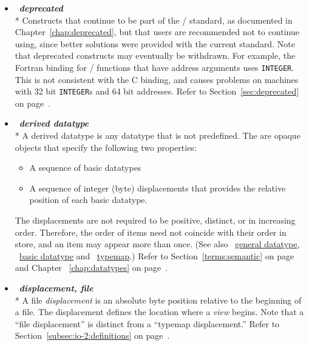 \begin{itemize}
\label{glossary:deprecated}
\item  ~\hypertarget{glossary:deprecated}{\emph{\textbf{deprecated}}} \\*
Constructs that continue to be part of the \MPI/ standard, 
as documented in Chapter~\ref{chap:deprecated}, 
but that users are recommended not to continue using, since 
better solutions were provided with the current standard.
Note that deprecated constructs may eventually be withdrawn.
For example, the Fortran binding 
for \mpii/ functions that have address arguments uses {\tt INTEGER}.
This is not consistent with the C binding, and causes problems on
machines with 32 bit {\tt INTEGER}s and 64 bit addresses.
Refer to Section~\ref{sec:deprecated} on page~\pageref{sec:deprecated}.

\label{glossary:derived_datatype}
\item  ~\hypertarget{glossary:derived_datatype}{\emph{\textbf{derived datatype}}} \\*
A derived datatype is any datatype that is not predefined.
The are opaque objects that specify the following two
properties:
\begin{itemize}
\item
A sequence of basic datatypes
\item
A sequence of integer (byte) displacements that provides the relative
position of each basic datatype.
\end{itemize}
The displacements are not required to be positive, distinct, or
in increasing order. Therefore, the order of items need not
coincide with their order in store, and an item may appear more than
once. (See also ~\hyperlink{glossary:general_datatype}{general datatype}, ~\hyperlink{glossary:basic_datatype}{basic datatype} 
and  ~\hyperlink{glossary:typemap}{typemap}.)
Refer to Section~\ref{terms:semantic} on page~\pageref{terms:semantic} and 
Chapter ~\ref{chap:datatypes} on page~\pageref{chap:datatypes}.

\label{glossary:displacement_file}
\item  ~\hypertarget{glossary:displacement_file}{\emph{\textbf{displacement, file}}} \\*
A file {\it displacement} is an absolute byte position
relative to the beginning of a file.
The displacement defines the location where a {\it view} begins.
Note that a ``file displacement'' is distinct from a ``typemap displacement.''
Refer to Section~\ref{subsec:io-2:definitions} on page~\pageref{subsec:io-2:definitions}.


\end{itemize}

